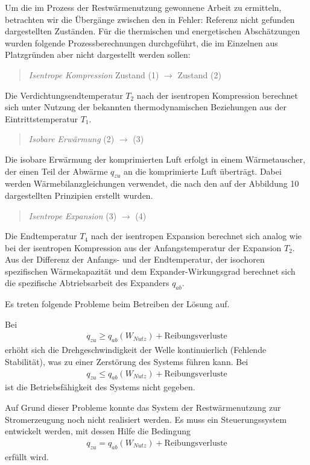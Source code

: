 \documentclass[11pt,a4paper]{article}
\begin{document}
Um die im Prozess der Restwärmenutzung gewonnene Arbeit zu ermitteln,
betrachten wir die Übergänge zwischen den in Fehler: Referenz nicht gefunden
dargestellten Zuständen. Für die thermischen und energetischen Abschätzungen
wurden folgende Prozessberechnungen durchgeführt, die im Einzelnen aus
Platzgründen aber nicht dargestellt werden sollen:
\begin{quote}
  \emph{Isentrope Kompression} Zustand (1) $\to$ Zustand (2)
\end{quote}
Die Verdichtungsendtemperatur $T_2$ nach der isentropen Kompression berechnet
sich unter Nutzung der bekannten thermodynamischen Beziehungen aus der
Eintrittstemperatur $T_1$.
\begin{quote}
  \emph{Isobare Erwärmung} (2) $\to$ (3) 
\end{quote}
Die isobare Erwärmung der komprimierten Luft erfolgt in einem Wärmetauscher,
der einen Teil der Abwärme $q_{zu}$ an die komprimierte Luft überträgt. Dabei
werden Wärmebilanzgleichungen verwendet, die nach den auf der Abbildung 10
dargestellten Prinzipien erstellt wurden.
\begin{quote}
  \emph{Isentrope Expansion} (3) $\to$ (4)
\end{quote}
Die Endtemperatur $T_4$ nach der isentropen Expansion berechnet sich analog wie
bei der isentropen Kompression aus der Anfangstemperatur der Expansion $T_2$.
Aus der Differenz der Anfangs- und der Endtemperatur, der isochoren
spezifischen Wärmekapazität und dem Expander-Wirkungsgrad berechnet sich die
spezifische Abtriebsarbeit des Expanders $q_{ab}$.

Es treten folgende Probleme beim Betreiben der Lösung auf.

Bei 
\begin{gather*}
  q_{zu} \ge q_{ab}(W_{Nutz})+\text{Reibungsverluste} \tag{5}
\end{gather*}
erhöht sich die Drehgeschwindigkeit der Welle kontinuierlich (Fehlende
Stabilität), was zu einer Zerstörung des Systems führen kann.  Bei
\begin{gather*}
  q_{zu} \le q_{ab}(W_{Nutz})+\text{Reibungsverluste} \tag{6}
\end{gather*}
ist die Betriebsfähigkeit des Systems nicht gegeben.

Auf Grund dieser Probleme konnte das System der Restwärmenutzung zur
Stromerzeugung noch nicht realisiert werden. Es muss ein Steuerungssystem
entwickelt werden, mit dessen Hilfe die Bedingung   
\begin{gather*}
  q_{zu} = q_{ab}(W_{Nutz})+\text{Reibungsverluste} \tag{7}
\end{gather*}
erfüllt wird. 
\end{document}
